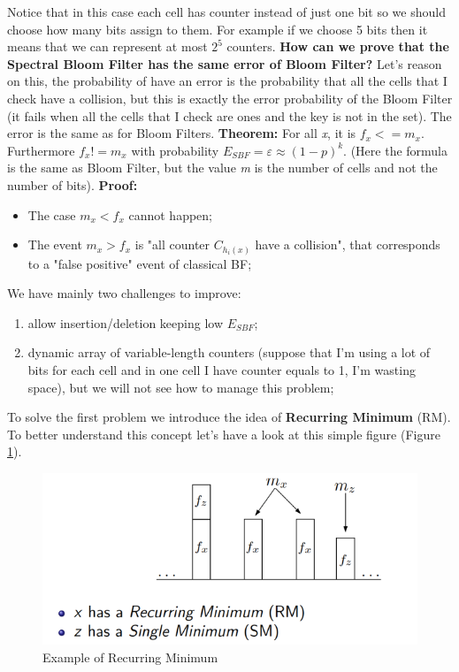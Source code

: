 Notice that in this case each cell has counter instead of just one bit so we should choose how many bits assign to them. For example if we choose 5 bits then it means that we can represent at most $2^5$ counters.\newline
\textbf{How can we prove that the Spectral Bloom Filter has the same error of Bloom Filter?} Let's reason on this, the probability of have an error is the probability that all the cells that I check have a collision, but this is exactly the error probability of the Bloom Filter (it fails when all the cells that I check are ones and the key is not in the set). The error is the same as for Bloom Filters.\newline
\textbf{Theorem:} For all \textit{x}, it is $f_x <= m_x$. Furthermore $f_x != m_x$ with probability $E_{SBF}= \varepsilon \approx (1-p)^k$. (Here the formula is the same as Bloom Filter, but the value \textit{m} is the number of cells and not the number of bits).\newline
\textbf{Proof:}
\begin{itemize}
    \item The case $m_x < f_x$ cannot happen;
    \item The event $m_x > f_x$ is "all counter $C_{h_i(x)}$ have a collision", that corresponds to a "false positive" event of classical BF;
\end{itemize} 
We have mainly two challenges to improve:
\begin{enumerate}
    \item allow insertion/deletion keeping low $E_{SBF}$;
    \item dynamic array of variable-length counters (suppose that I'm using a lot of bits for each cell and in one cell I have counter equals to 1, I'm wasting space), but we will not see how to manage this problem;
\end{enumerate}
To solve the first problem we introduce the idea of \textbf{Recurring Minimum} (RM). To better understand this concept let's have a look at this simple figure (Figure \ref{fig:recurringminima}).
\begin{figure}
    \centering
    \includegraphics[width=0.75\linewidth]{images/recurringminima.png}
    \caption{Example of Recurring Minimum}
    \label{fig:recurringminima}
\end{figure}
